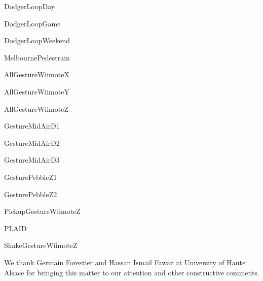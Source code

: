 \begin{DoxyEnumerate}
\item Dodger\+Loop\+Day
\item Dodger\+Loop\+Game
\item Dodger\+Loop\+Weekend
\item Melbourne\+Pedestrain
\item All\+Gesture\+WiimoteX
\item All\+Gesture\+WiimoteY
\item All\+Gesture\+WiimoteZ
\item Gesture\+Mid\+Air\+D1
\item Gesture\+Mid\+Air\+D2
\item Gesture\+Mid\+Air\+D3
\item Gesture\+Pebble\+Z1
\item Gesture\+Pebble\+Z2
\item Pickup\+Gesture\+WiimoteZ
\item PLAID
\item Shake\+Gesture\+WiimoteZ
\end{DoxyEnumerate}

We thank Germain Forestier and Hassan Ismail Fawaz at University of Haute Alsace for bringing this matter to our attention and other constructive comments. 